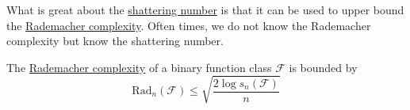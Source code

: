   What is great about the \hyperref[def:shattering-number]{shattering number} is that it can be used to upper bound the \hyperref[def:rademacher-complexity]{Rademacher complexity}. Often times, we do not know the Rademacher complexity but know the shattering number. 

  \begin{theorem}
    \label{thm:bound-of-rademacher-complexity-with-shattering}
    The \hyperref[def:rademacher-complexity]{Rademacher complexity} of a binary function class $\mathcal{F}$ is bounded by 
    \begin{equation}
      \mathrm{Rad}_n (\mathcal{F}) \leq \sqrt{\frac{2 \log s_n (\mathcal{F})}{n}}
    \end{equation}
  \end{theorem}
